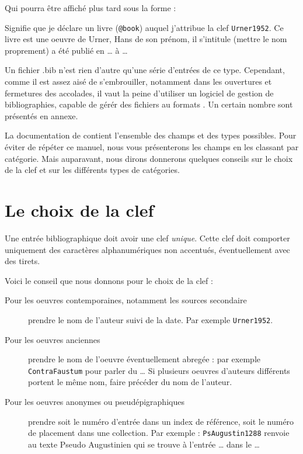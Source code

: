 Qui pourra être affiché plus tard sous la forme :

\begin{quote}
\cite{urner}
\end{quote}


Signifie que je déclare un livre (\verb|@book|) auquel j'attribue la clef \verb|Urner1952|. Ce livre est une oeuvre de Urner, Hans de son prénom, il s'intitule (mettre le nom proprement) a été publié en … à …

Un fichier .bib n'est rien d'autre qu'une  série d'entrées de ce type. Cependant, comme il est assez aisé de s'embrouiller, notamment dans les ouvertures et fermetures des accolades, il vaut la peine d'utiliser un logiciel de gestion de bibliographies, capable de gérér  des fichiers au formats . Un certain nombre sont présentés en annexe.

La documentation de  contient l'ensemble des champs et des types possibles. Pour éviter de répéter ce manuel, nous vous présenterons les champs en les classant par catégorie. Mais auparavant, nous dirons donnerons quelques conseils sur le choix de la clef et sur les différents types de catégories.

\section{Le choix de la clef}

Une entrée bibliographique doit avoir une clef \emph{unique}. Cette clef doit comporter uniquement des caractères alphanumériques non accentués, éventuellement avec des tirets. 

Voici le conseil que nous donnons pour le choix de la clef :
\begin{description}
\item[Pour les oeuvres contemporaines, notamment les sources secondaire] prendre le nom de l'auteur suivi de la date. Par exemple \verb|Urner1952|.
\item[Pour les oeuvres anciennes] prendre le nom de l'oeuvre  éventuellement abregée : par exemple \verb|ContraFaustum| pour parler du … Si plusieurs oeuvres d'auteurs différents portent le même nom, faire précéder du nom de l'auteur.
\item[Pour les oeuvres anonymes ou pseudépigraphiques] prendre soit le numéro d'entrée dans un index de référence, soit le numéro de placement dans une collection. Par exemple : \verb|PsAugustin1288| renvoie au texte Pseudo Augustinien qui se trouve à l'entrée … dans le …
\end{description}


